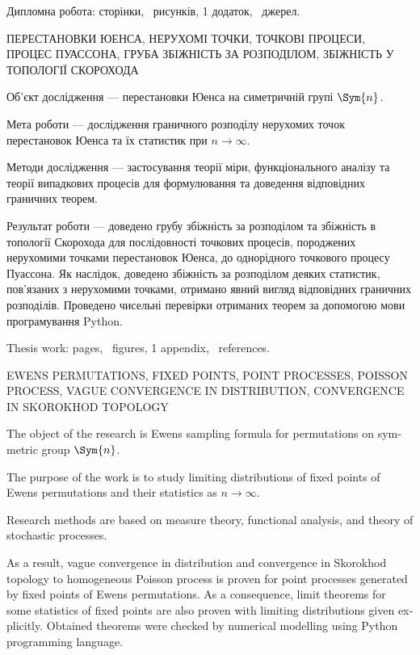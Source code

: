 
Дипломна робота: \pageref*{LastPage} сторінки, 
\totalfigures\ рисунків, 1 додаток, \totref\ джерел.

\vspace{5mm}
\noindent\MakeUppercase{
    Перестановки Юенса, нерухомі точки, точкові процеси, процес Пуассона,
    груба збіжність за розподілом, збіжність у топології Скорохода
}
\vspace{5mm}

Об'єкт дослідження --- перестановки Юенса на симетричній групі $\Sym{n}$.

Мета роботи --- дослідження граничного розподілу
нерухомих точок перестановок Юенса та їх статистик
при $n \to \infty$.

Методи дослідження --- застосування теорії міри, функціонального аналізу
та теорії випадкових процесів для формулювання та доведення відповідних граничних теорем.

Результат роботи --- доведено грубу збіжність за розподілом
та збіжність в топології Скорохода для послідовності
точкових процесів, породжених нерухомими точками
перестановок Юенса, до однорідного точкового процесу Пуассона.
Як наслідок, доведено збіжність за розподілом
деяких статистик, пов'язаних з нерухомими точками, 
отримано явний вигляд відповідних граничних розподілів.
Проведено чисельні перевірки отриманих теорем за допомогою
мови програмування Python.

\newpage
\begin{english}

Thesis work: \pageref*{LastPage} pages, 
\totalfigures\ figures, 1 appendix, \totref\ references.

\vspace{5mm}
\noindent\MakeUppercase{
    Ewens permutations, fixed points, point processes, Poisson process,
    vague convergence in distribution, convergence in Skorokhod topology
}
\vspace{5mm}

The object of the research is Ewens sampling formula for permutations on symmetric group $\Sym{n}$.

The purpose of the work is to study limiting distributions of fixed points of Ewens permutations and
their statistics as $n \to \infty$.

Research methods are based on measure theory, functional analysis, and theory of stochastic processes.

As a result, vague convergence in distribution and convergence in Skorokhod topology to 
homogeneous Poisson process is proven for
point processes generated by fixed points of Ewens permutations. As a consequence,
limit theorems for some statistics of fixed points are also proven with limiting distributions given explicitly.
Obtained theorems were checked by numerical modelling using Python programming language.
\end{english}
\newpage
